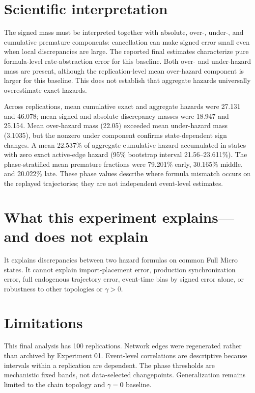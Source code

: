 \documentclass[11pt]{article}
\begin{document}
\section{Scientific interpretation}
The signed mass must be interpreted together with absolute, over-, under-, and cumulative premature components: cancellation can make signed error small even when local discrepancies are large. The reported final estimates characterize pure formula-level rate-abstraction error for this baseline. Both over- and under-hazard mass are present, although the replication-level mean over-hazard component is larger for this baseline. This does not establish that aggregate hazards universally overestimate exact hazards.

Across replications, mean cumulative exact and aggregate hazards were 27.131 and 46.078; mean signed and absolute discrepancy masses were 18.947 and 25.154. Mean over-hazard mass (22.05) exceeded mean under-hazard mass (3.1035), but the nonzero under component confirms state-dependent sign changes. A mean 22.537\% of aggregate cumulative hazard accumulated in states with zero exact active-edge hazard (95\% bootstrap interval 21.56--23.611\%). The phase-stratified mean premature fractions were 79.201\% early, 30.165\% middle, and 20.022\% late. These phase values describe where formula mismatch occurs on the replayed trajectories; they are not independent event-level estimates.

\section{What this experiment explains---and does not explain}
It explains discrepancies between two hazard formulas on common Full Micro states. It cannot explain import-placement error, production synchronization error, full endogenous trajectory error, event-time bias by signed error alone, or robustness to other topologies or $\gamma>0$.

\section{Limitations}
This final analysis has 100 replications. Network edges were regenerated rather than archived by Experiment 01. Event-level correlations are descriptive because intervals within a replication are dependent. The phase thresholds are mechanistic fixed bands, not data-selected changepoints. Generalization remains limited to the chain topology and $\gamma=0$ baseline.
\end{document}

